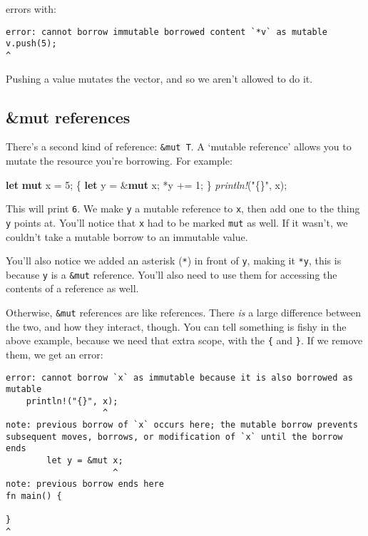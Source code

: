 \documentclass[a4paper,]{book}
\newenvironment{Shaded}{\begin{snugshade}}{\end{snugshade}}
\newcommand{\KeywordTok}[1]{\textcolor[rgb]{0.13,0.29,0.53}{\textbf{{#1}}}}
\newcommand{\DecValTok}[1]{\textcolor[rgb]{0.00,0.00,0.81}{{#1}}}
\newcommand{\StringTok}[1]{\textcolor[rgb]{0.31,0.60,0.02}{{#1}}}
\newcommand{\PreprocessorTok}[1]{\textcolor[rgb]{0.56,0.35,0.01}{\textit{{#1}}}}
\newcommand{\NormalTok}[1]{{#1}}
\begin{document}
errors with:

\begin{verbatim}
error: cannot borrow immutable borrowed content `*v` as mutable
v.push(5);
^
\end{verbatim}

Pushing a value mutates the vector, and so we aren't allowed to do it.

\subsection{\&mut references}\label{mut-references}

There's a second kind of reference: \texttt{\&mut\ T}. A `mutable
reference' allows you to mutate the resource you're borrowing. For
example:

\begin{Shaded}
\begin{Highlighting}[]
\KeywordTok{let} \KeywordTok{mut} \NormalTok{x = }\DecValTok{5}\NormalTok{;}
\NormalTok{\{}
    \KeywordTok{let} \NormalTok{y = &}\KeywordTok{mut} \NormalTok{x;}
    \NormalTok{*y += }\DecValTok{1}\NormalTok{;}
\NormalTok{\}}
\PreprocessorTok{println!}\NormalTok{(}\StringTok{"\{\}"}\NormalTok{, x);}
\end{Highlighting}
\end{Shaded}

This will print \texttt{6}. We make \texttt{y} a mutable reference to
\texttt{x}, then add one to the thing \texttt{y} points at. You'll
notice that \texttt{x} had to be marked \texttt{mut} as well. If it
wasn't, we couldn't take a mutable borrow to an immutable value.

You'll also notice we added an asterisk (\texttt{*}) in front of
\texttt{y}, making it \texttt{*y}, this is because \texttt{y} is a
\texttt{\&mut} reference. You'll also need to use them for accessing the
contents of a reference as well.

Otherwise, \texttt{\&mut} references are like references. There
\emph{is} a large difference between the two, and how they interact,
though. You can tell something is fishy in the above example, because we
need that extra scope, with the \texttt{\{} and \texttt{\}}. If we
remove them, we get an error:

\begin{verbatim}
error: cannot borrow `x` as immutable because it is also borrowed as mutable
    println!("{}", x);
                   ^
note: previous borrow of `x` occurs here; the mutable borrow prevents
subsequent moves, borrows, or modification of `x` until the borrow ends
        let y = &mut x;
                     ^
note: previous borrow ends here
fn main() {

}
^
\end{verbatim}
\end{document}
